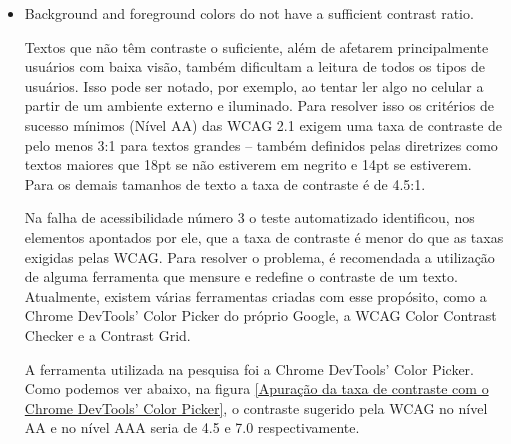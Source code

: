 \documentclass[
	12pt,				%
	openright,			%
	oneside,			%
	a4paper,			%
	chapter=TITLE,		%
	section=TITLE,		%
	subsection=TITLE,	%
	subsubsection=TITLE,%
	english,			%
	brazil				%
	]{abntex2}
\theoremstyle{definition}
\begin{document}
\begin{itemize}
Sendo assim, o problema poderia ser resolvido refatorando o case acima como é ilustrado na figura \ref{Acréscimo das roles options para criar uma associação com a listbox}.

\begin{figure}[!h]
\centering
\caption{Acréscimo das roles options para criar uma associação com a listbox}
\label{Acréscimo das roles options para criar uma associação com a listbox}
\end{figure}

\pagebreak

   \item Background and foreground colors do not have a sufficient contrast ratio.
   
Textos que não têm contraste o suficiente, além de afetarem principalmente usuários com baixa visão, também dificultam a leitura de todos os tipos de usuários. Isso pode ser notado, por exemplo, ao tentar ler algo no celular a partir de um ambiente externo e iluminado. Para resolver isso os critérios de sucesso mínimos (Nível AA) das WCAG 2.1 exigem uma taxa de contraste de pelo menos 3:1 para textos grandes – também definidos pelas diretrizes como textos maiores que 18pt se não estiverem em negrito e 14pt se estiverem. Para os demais tamanhos de texto a taxa de contraste é de 4.5:1.

Na falha de acessibilidade número 3 o teste automatizado identificou, nos elementos apontados por ele, que a taxa de contraste é menor do que as taxas exigidas pelas WCAG. Para resolver o problema, é recomendada a utilização de alguma ferramenta que mensure e redefine o contraste de um texto. Atualmente, existem várias ferramentas criadas com esse propósito, como a Chrome DevTools' Color Picker do próprio Google, a WCAG Color Contrast Checker e a Contrast Grid.

A ferramenta utilizada na pesquisa foi a Chrome DevTools’ Color Picker. Como podemos ver abaixo, na figura \ref{Apuração da taxa de contraste com o Chrome DevTools’ Color Picker}, o contraste sugerido pela WCAG no nível AA e no nível AAA seria de 4.5 e 7.0 respectivamente.


\end{itemize}
\end{document}
